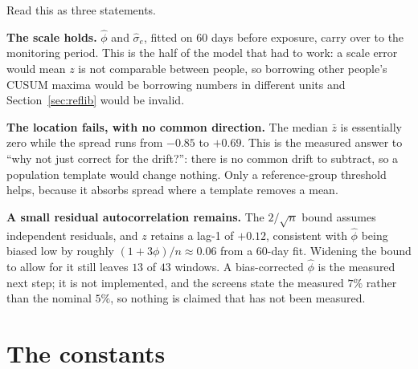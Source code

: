 \documentclass{article}
\theoremstyle{plain}
\theoremstyle{definition}
\theoremstyle{remark}
\numberwithin{equation}{section}
\begin{document}
Read this as three statements.

\textbf{The scale holds.} $\hat\phi$ and $\hat\sigma_e$, fitted on 60 days
before exposure, carry over to the monitoring period. This is the half of the
model that had to work: a scale error would mean $z$ is not comparable between
people, so borrowing other people's CUSUM maxima would be borrowing numbers in
different units and Section~\ref{sec:reflib} would be invalid.

\textbf{The location fails, with no common direction.} The median $\bar z$ is
essentially zero while the spread runs from $-0.85$ to $+0.69$. This is the
measured answer to ``why not just correct for the drift?'': there is no common
drift to subtract, so a population template would change nothing. Only a
reference-group threshold helps, because it absorbs spread where a template
removes a mean.

\textbf{A small residual autocorrelation remains.} The $2/\sqrt{n}$ bound
assumes independent residuals, and $z$ retains a lag-1 of $+0.12$, consistent
with $\hat\phi$ being biased low by roughly $(1+3\phi)/n \approx 0.06$ from a
60-day fit. Widening the bound to allow for it still leaves $13$ of $43$
windows. A bias-corrected $\hat\phi$ is the measured next step; it is not
implemented, and the screens state the measured $7\%$ rather than the nominal
$5\%$, so nothing is claimed that has not been measured.

\section{The constants}
\label{sec:constants}
\end{document}
